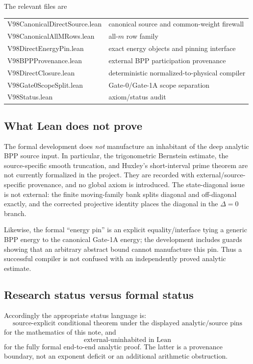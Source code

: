 \documentclass[11pt]{article}
\theoremstyle{definition}
\newcommand{\1}{\mathbf 1}
\begin{document}
The relevant files are
\begin{center}
\begin{tabular}{>{\ttfamily}l l}
\toprule
V98CanonicalDirectSource.lean & canonical source and common-weight firewall\\
V98CanonicalAllMRows.lean & all-$m$ row family\\
V98DirectEnergyPin.lean & exact energy objects and pinning interface\\
V98BPPProvenance.lean & external BPP participation provenance\\
V98DirectClosure.lean & deterministic normalized-to-physical compiler\\
V98Gate0ScopeSplit.lean & Gate-0/Gate-1A scope separation\\
V98Status.lean & axiom/status audit\\
\bottomrule
\end{tabular}
\end{center}

\subsection{What Lean does not prove}
The formal development does \emph{not} manufacture an inhabitant of the deep
analytic BPP source input.  In particular, the trigonometric Bernstein
estimate, the source-specific smooth truncation, and Huxley's short-interval
prime theorem are not currently formalized in the project.  They are recorded
with external/source-specific provenance, and no global axiom is introduced.
The state-diagonal issue is not external: the finite moving-family bank splits
diagonal and off-diagonal exactly, and the corrected projective identity places
the diagonal in the $\Delta=0$ branch.

Likewise, the formal ``energy pin'' is an explicit equality/interface tying a
generic BPP energy to the canonical Gate-1A energy; the development includes
guards showing that an arbitrary abstract bound cannot manufacture this pin.
Thus a successful compiler is not confused with an independently proved
analytic estimate.

\subsection{Research status versus formal status}
Accordingly the appropriate status language is:
\[
 \boxed{\text{source-explicit conditional theorem under the displayed analytic/source pins}}
\]
for the mathematics of this note, and
\[
 \boxed{\text{external-uninhabited in Lean}}
\]
for the fully formal end-to-end analytic proof.  The latter is a provenance
boundary, not an exponent deficit or an additional arithmetic obstruction.
\end{document}
